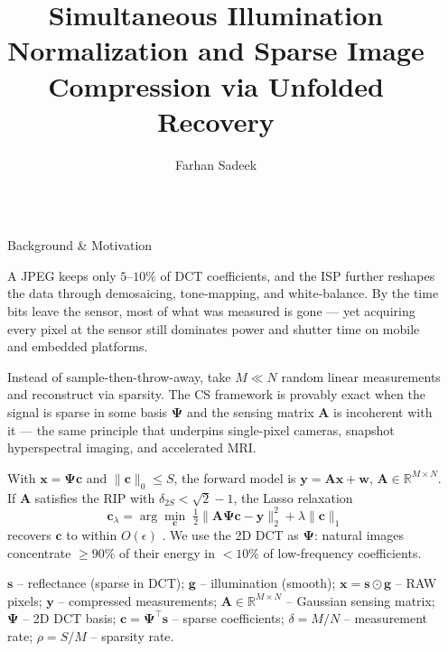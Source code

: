 \documentclass[final]{beamer}
\title{Simultaneous Illumination Normalization and Sparse Image Compression via Unfolded Recovery}
\author{Farhan Sadeek\inst{1}}
\institute[Dartmouth]{\inst{1} Thayer School of Engineering, Dartmouth College, Hanover, NH 03755, USA}
\newlength{\sepwidth}
\newlength{\colwidth}
\newcommand{\separatorcolumn}{
  \begin{column}{\sepwidth}
\end{column}}
\begin{document}
\begin{frame}[t]
  \begin{columns}[t]
    \separatorcolumn

    \begin{column}{\colwidth}

      \begin{block}{Background \& Motivation}

        A JPEG keeps only $5$--$10\%$ of DCT coefficients, and the
        ISP further reshapes the data through demosaicing,
        tone-mapping, and white-balance. By the time bits leave the
        sensor, most of what was measured is gone --- yet acquiring
        every pixel at the sensor still dominates power and shutter
        time on mobile and embedded platforms.

        Instead of sample-then-throw-away, take $M\!\ll\!N$ random
        linear measurements and reconstruct via sparsity. The CS
        framework is provably exact when the signal is sparse in some
        basis $\bm{\Psi}$ and the sensing matrix $\boldsymbol{A}$ is
        incoherent with it
        \citep{candes2006stable,donoho2006compressed} --- the same
        principle that underpins single-pixel cameras, snapshot
        hyperspectral imaging, and accelerated MRI.

        With $\boldsymbol{x}{=}\bm{\Psi}\boldsymbol{c}$ and
        $\|\boldsymbol{c}\|_0\!\leq\!S$, the forward model is
        $\boldsymbol{y}{=}\boldsymbol{A}\boldsymbol{x}{+}\boldsymbol{w}$,
        $\boldsymbol{A}{\in}\mathbb R^{M{\times}N}$. If
        $\boldsymbol{A}$ satisfies the RIP with
        $\delta_{2S}\!<\!\sqrt 2{-}1$, the Lasso relaxation
        \[
          \boldsymbol{c}_\lambda
          =\arg\min_{\boldsymbol{c}}\;\tfrac12\|\boldsymbol{A}\bm{\Psi}\boldsymbol{c}-\boldsymbol{y}\|_2^2
          +\lambda\|\boldsymbol{c}\|_1
        \]
        recovers $\boldsymbol{c}$ to within $O(\epsilon)$
        \citep{candes2006stable}. We use the 2D DCT as $\bm{\Psi}$:
        natural images concentrate $\geq\!90\%$ of their energy in
        $<\!10\%$ of low-frequency coefficients.

        $\boldsymbol{s}$ -- reflectance (sparse in DCT);
        \;\;$\boldsymbol{g}$ -- illumination (smooth);
        \;\;$\boldsymbol{x}{=}\boldsymbol{s}\!\odot\!\boldsymbol{g}$ -- RAW pixels;
        \;\;$\boldsymbol{y}$ -- compressed measurements;
        \;\;$\boldsymbol{A}{\in}\mathbb R^{M\times N}$ -- Gaussian sensing matrix;
        \;\;$\bm{\Psi}$ -- 2D DCT basis;
        \;\;$\boldsymbol{c}{=}\bm{\Psi}^{\!\top}\boldsymbol{s}$ -- sparse coefficients;
        \;\;$\delta{=}M/N$ -- measurement rate;
        \;\;$\rho{=}S/M$ -- sparsity rate.


\end{block}
\end{column}
\end{columns}
\end{frame}
\end{document}
